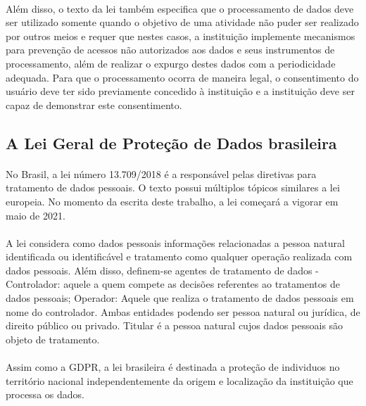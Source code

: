 \paragraph{} Além disso, o texto da lei também especifica que o processamento de dados deve ser utilizado somente quando o objetivo de uma atividade não puder ser realizado por outros meios e requer que nestes casos, a instituição implemente mecanismos para prevenção de acessos não autorizados aos dados e seus instrumentos de processamento, além de realizar o expurgo destes dados com a periodicidade adequada. Para que o processamento ocorra de maneira legal, o consentimento do usuário deve ter sido previamente concedido à instituição e a instituição deve ser capaz de demonstrar este consentimento.


\subsection{A Lei Geral de Proteção de Dados brasileira}

\paragraph{} No Brasil, a lei número 13.709/2018\cite{br-13709-2018} é a responsável pelas diretivas para tratamento de dados pessoais. O texto possui múltiplos tópicos similares a lei europeia. No momento da escrita deste trabalho, a lei começará a vigorar em maio de 2021. 

\paragraph{} A lei considera como dados pessoais informações relacionadas a pessoa natural identificada ou identificável e tratamento como qualquer operação realizada com dados pessoais. Além disso, definem-se agentes de tratamento de dados - Controlador: aquele a quem compete as decisões referentes ao tratamentos de dados pessoais; Operador: Aquele que realiza o tratamento de dados pessoais em nome do controlador. Ambas entidades podendo ser pessoa natural ou jurídica, de direito público ou privado. Titular é a pessoa natural cujos dados pessoais são objeto de tratamento.

\paragraph{} Assim como a GDPR, a lei brasileira é destinada a proteção de individuos no território nacional independentemente da origem e localização da instituição que processa os dados.

